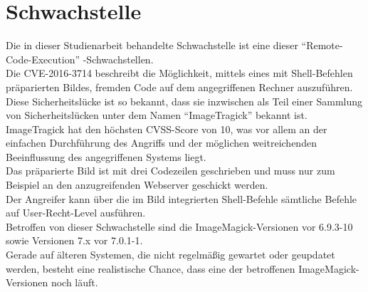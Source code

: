 \section{Schwachstelle}\label{sec:schwachstelle}

Die in dieser Studienarbeit behandelte Schwachstelle ist eine dieser "`Remote-Code-Execution"' -Schwachstellen.\\

Die CVE-2016-3714 beschreibt die Möglichkeit, mittels eines mit Shell-Befehlen präparierten Bildes, fremden Code auf dem angegriffenen Rechner auszuführen.\\

Diese Sicherheitslücke ist so bekannt, dass sie inzwischen als Teil einer Sammlung von Sicherheitslücken unter dem Namen "`ImageTragick"' bekannt ist.\\

ImageTragick hat den höchsten CVSS-Score von 10, was vor allem an der einfachen Durchführung des Angriffs und der möglichen weitreichenden Beeinflussung des angegriffenen Systems liegt.\\
Das präparierte Bild ist mit drei Codezeilen geschrieben und muss nur zum Beispiel an den anzugreifenden Webserver geschickt werden.\\
Der Angreifer kann über die im Bild integrierten Shell-Befehle sämtliche Befehle auf User-Recht-Level ausführen.\\

Betroffen von dieser Schwachstelle sind die ImageMagick-Versionen vor 6.9.3-10 sowie Versionen 7.x vor 7.0.1-1.\\
Gerade auf älteren Systemen, die nicht regelmäßig gewartet oder geupdatet werden, besteht eine realistische Chance, dass eine der betroffenen ImageMagick-Versionen noch läuft.\\